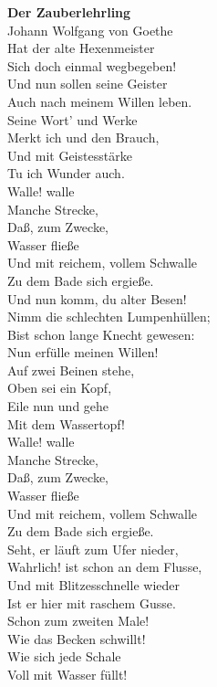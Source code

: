 {
    {\large \textbf{Der Zauberlehrling} \\
        Johann Wolfgang von Goethe} \\

    Hat der alte Hexenmeister \\
    Sich doch einmal wegbegeben!  \\
    Und nun sollen seine Geister \\
    Auch nach meinem Willen leben. \\
    Seine Wort' und Werke \\
    Merkt ich und den Brauch, \\
    Und mit Geistesstärke \\
    Tu ich Wunder auch. \\

    Walle! walle \\
    Manche Strecke, \\
    Daß, zum Zwecke, \\
    Wasser fließe \\
    Und mit reichem, vollem Schwalle \\
    Zu dem Bade sich ergieße. \\

    Und nun komm, du alter Besen! \\
    Nimm die schlechten Lumpenhüllen; \\
    Bist schon lange Knecht gewesen: \\
    Nun erfülle meinen Willen! \\
    Auf zwei Beinen stehe, \\
    Oben sei ein Kopf, \\
    Eile nun und gehe \\
    Mit dem Wassertopf! \\

    Walle! walle \\
    Manche Strecke, \\
    Daß, zum Zwecke, \\
    Wasser fließe \\
    Und mit reichem, vollem Schwalle \\
    Zu dem Bade sich ergieße. \\

    Seht, er läuft zum Ufer nieder, \\
    Wahrlich! ist schon an dem Flusse, \\
    Und mit Blitzesschnelle wieder \\
    Ist er hier mit raschem Gusse. \\
    Schon zum zweiten Male! \\
    Wie das Becken schwillt! \\
    Wie sich jede Schale \\
    Voll mit Wasser füllt! \\

}

